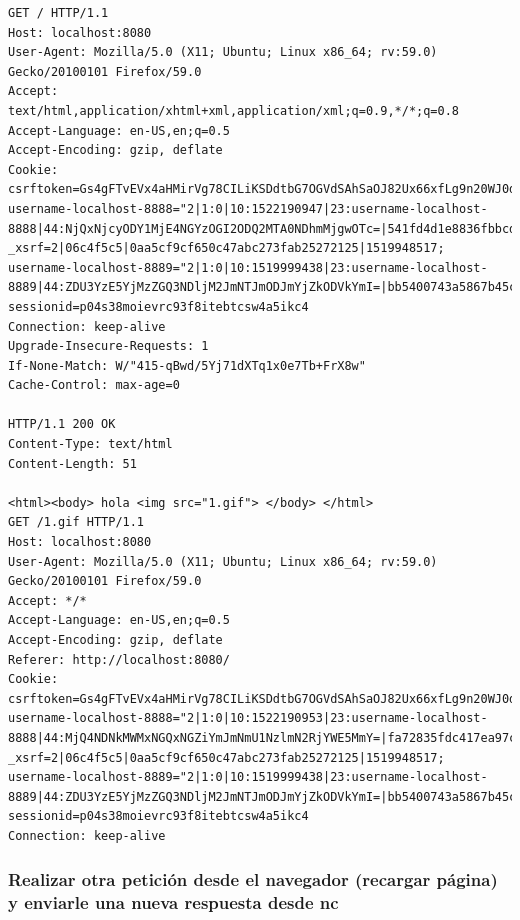 \documentclass[11pt]{article}
\begin{document}
\begin{verbatim}
GET / HTTP/1.1
Host: localhost:8080
User-Agent: Mozilla/5.0 (X11; Ubuntu; Linux x86_64; rv:59.0) Gecko/20100101 Firefox/59.0
Accept: text/html,application/xhtml+xml,application/xml;q=0.9,*/*;q=0.8
Accept-Language: en-US,en;q=0.5
Accept-Encoding: gzip, deflate
Cookie: csrftoken=Gs4gFTvEVx4aHMirVg78CILiKSDdtbG7OGVdSAhSaOJ82Ux66xfLg9n20WJ0dhri; username-localhost-8888="2|1:0|10:1522190947|23:username-localhost-8888|44:NjQxNjcyODY1MjE4NGYzOGI2ODQ2MTA0NDhmMjgwOTc=|541fd4d1e8836fbbcd93f4a0c4ec0e84ad4c54338f6eb79bad4d235dcc5ae1f8"; _xsrf=2|06c4f5c5|0aa5cf9cf650c47abc273fab25272125|1519948517; username-localhost-8889="2|1:0|10:1519999438|23:username-localhost-8889|44:ZDU3YzE5YjMzZGQ3NDljM2JmNTJmODJmYjZkODVkYmI=|bb5400743a5867b45c2dfa99852c9eac13d20d0e588218d6bdd78e8a355f8766"; sessionid=p04s38moievrc93f8itebtcsw4a5ikc4
Connection: keep-alive
Upgrade-Insecure-Requests: 1
If-None-Match: W/"415-qBwd/5Yj71dXTq1x0e7Tb+FrX8w"
Cache-Control: max-age=0

HTTP/1.1 200 OK
Content-Type: text/html
Content-Length: 51

<html><body> hola <img src="1.gif"> </body> </html>
GET /1.gif HTTP/1.1
Host: localhost:8080
User-Agent: Mozilla/5.0 (X11; Ubuntu; Linux x86_64; rv:59.0) Gecko/20100101 Firefox/59.0
Accept: */*
Accept-Language: en-US,en;q=0.5
Accept-Encoding: gzip, deflate
Referer: http://localhost:8080/
Cookie: csrftoken=Gs4gFTvEVx4aHMirVg78CILiKSDdtbG7OGVdSAhSaOJ82Ux66xfLg9n20WJ0dhri; username-localhost-8888="2|1:0|10:1522190953|23:username-localhost-8888|44:MjQ4NDNkMWMxNGQxNGZiYmJmNmU1NzlmN2RjYWE5MmY=|fa72835fdc417ea97c5ff89a5756e289cb6f835bb501f5343153a5faf3d0aece"; _xsrf=2|06c4f5c5|0aa5cf9cf650c47abc273fab25272125|1519948517; username-localhost-8889="2|1:0|10:1519999438|23:username-localhost-8889|44:ZDU3YzE5YjMzZGQ3NDljM2JmNTJmODJmYjZkODVkYmI=|bb5400743a5867b45c2dfa99852c9eac13d20d0e588218d6bdd78e8a355f8766"; sessionid=p04s38moievrc93f8itebtcsw4a5ikc4
Connection: keep-alive
\end{verbatim}

    \hypertarget{realizar-otra-peticiuxf3n-desde-el-navegador-recargar-puxe1gina-y-enviarle-una-nueva-respuesta-desde-nc}{%
\subsubsection{Realizar otra petición desde el navegador (recargar
página) y enviarle una nueva respuesta desde
nc}\label{realizar-otra-peticiuxf3n-desde-el-navegador-recargar-puxe1gina-y-enviarle-una-nueva-respuesta-desde-nc}}
\end{document}
